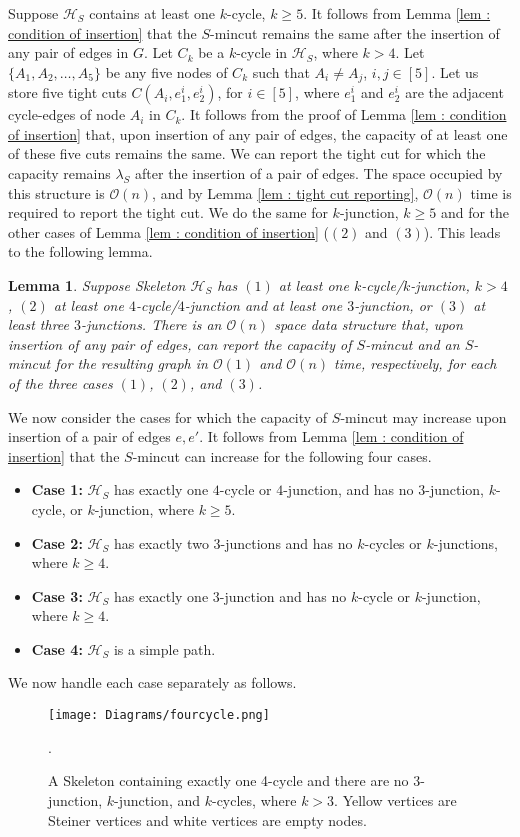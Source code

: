 \documentclass[letterpaper,11pt]{article}
\newtheorem{lemma}{Lemma}[]
\begin{document}
Suppose ${\mathcal H}_S$ contains at least one $k$-cycle, $k\ge 5$. It follows from Lemma \ref{lem : condition of insertion} that the $S$-mincut remains the same after the insertion of any pair of edges in $G$. Let $C_k$ be a $k$-cycle in ${\mathcal H}_S$, where $k>4$. Let $\{A_1,A_2,\ldots,A_5\}$ be any five nodes of $C_k$ such that $A_i\ne A_j$, $i,j\in [5]$. Let us store five tight cuts $C(A_i,e_1^i,e_2^i)$, for $i\in [5]$, where $e_1^i$ and $e_2^i$ are the adjacent cycle-edges of node $A_i$ in $C_k$. It follows from the proof of Lemma \ref{lem : condition of insertion} that, upon insertion of any pair of edges, the capacity of at least one of these five cuts remains the same. We can report the tight cut for which the capacity remains $\lambda_S$ after the insertion of a pair of edges. 
The space occupied by this structure is ${\mathcal O}(n)$, and by Lemma \ref{lem : tight cut reporting}, ${\mathcal O}(n)$ time is required to report the tight cut. We do the same for $k$-junction, $k\ge 5$ and for the other cases of Lemma \ref{lem : condition of insertion} ($(2)$ and $(3)$). This leads to the following lemma.
\begin{lemma} \label{lem : does not increase conditions}
    Suppose Skeleton ${\mathcal H}_S$ has $(1)$ at least one $k$-cycle/$k$-junction, $k>4$, $(2)$ at least one $4$-cycle/$4$-junction and at least one $3$-junction, or $(3)$ at least three $3$-junctions. There is an ${\mathcal O}(n)$ space data structure that, upon insertion of any pair of edges, can report the capacity of $S$-mincut and an $S$-mincut for the resulting graph in ${\mathcal O}(1)$ and ${\mathcal O}(n)$ time, respectively, for each of the three cases $(1)$, $(2)$, and $(3)$.   
\end{lemma}

We now consider the cases for which the capacity of $S$-mincut may increase upon insertion of a pair of edges $e,e'$. It follows from Lemma \ref{lem : condition of insertion} that the $S$-mincut can increase for the following four cases. 
\begin{itemize}
    \item \textbf{Case 1:} ${\mathcal H}_S$ has exactly one $4$-cycle or $4$-junction, and has no $3$-junction, $k$-cycle, or $k$-junction, where $k\ge 5$. 
    \item \textbf{Case 2:} ${\mathcal H}_S$ has exactly two $3$-junctions and has no $k$-cycles or $k$-junctions, where $k\ge 4$.
\item \textbf{Case 3:} ${\mathcal H}_S$ has exactly one $3$-junction and has no $k$-cycle or $k$-junction, where $k\ge 4$. 
    \item \textbf{Case 4:} ${\mathcal H}_S$ is a simple path.     
\end{itemize}
We now handle each case separately as follows. \\
\begin{figure}
 \centering
    \texttt{[image: Diagrams/fourcycle.png]} 
   \caption{A Skeleton containing exactly one 4-cycle and there are no $3$-junction, $k$-junction, and $k$-cycles, where $k>3$. Yellow vertices are Steiner vertices and white vertices are empty nodes. }
  \label{fig : dual insertion, four cycle}. 
\end{figure}
\end{document}
